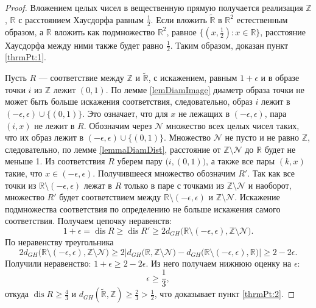 \documentclass[11pt,twoside,draft
]{article}
\DeclareMathOperator{\dis}{dis}
\begin{document}
\begin{proof}
  Вложением целых чисел в вещественную прямую получается реализация
  $\mathbb{Z}$, $\mathbb{R}$ с расстоянием Хаусдорфа равным $\frac 1 2$.
  Если вложить $\widetilde{\mathbb{R}}$ в $\mathbb{R}^{2}$
  естественным образом, а $\mathbb{R}$ вложить как подмножество
  $\mathbb{R}^{2}$, равное $\bigl\{(x, \frac1 2 ):x\in \mathbb{R}\bigr\}$,
  расстояние Хаусдорфа между ними также будет равно $\frac 1 2$.
  Таким образом, доказан пункт \ref{thrmPt:1}.

  Пусть $R$ --- соответствие
  между $\mathbb{Z}$ и $\widetilde{\mathbb{R}}$, с искажением,
  равным $1 + \epsilon$ и
  в образе точки $i$ из $\mathbb{Z}$ лежит $(0,1)$. По лемме
  \ref{lemDiamImage} диаметр
  образа точки не может быть больше искажения соответствия,
  следовательно, образ $i$ лежит в $(-\epsilon, \epsilon) \cup
  \bigl\{(0,1)\bigr\}$. Это
  означает, что для
  $x$ не лежащих в $(-\epsilon, \epsilon)$, пара $(i, x)$ не лежит в $R$.
  Обозначим через $\mathcal{N}$ множество всех целых чисел таких, что их
  образ лежит в $(-\epsilon, \epsilon) \cup \bigl\{(0,1)\bigr\}$. Множество
  $\mathcal{N}$ не пусто и не равно $\mathbb{Z}$, следовательно, по
  лемме \ref{lemmaDiamDist},
  расстояние от $\mathbb{Z} \setminus\mathcal{N}$ до $\mathbb{R}$ будет не
  меньше 1.
  Из соответствия $R$ уберем пару $\bigl(i,(0,1)\bigr)$, а также
  все пары $(k,x)$ такие, что $x \in  (-\epsilon, \epsilon)$.
  Получившееся множество обозначим $R'$.
  Так как все точки из $\mathbb{R}\setminus(-\epsilon, \epsilon)$ лежат в $R$
  только в паре с точками из $ \mathbb{Z} \setminus\mathcal{N}$ и наоборот,
  множество $R'$ будет соответствием между
  $\mathbb{R}\setminus(-\epsilon, \epsilon)$ и
  $ \mathbb{Z} \setminus\mathcal{N}$. Искажение
  подмножества соответствия по определению не больше искажения
  самого соответствия. Получаем цепочку неравенств:
  \[1+\epsilon = \dis R \ge \dis R' \ge
    2d_{GH}\bigl(\mathbb{R}\setminus(-\epsilon, \epsilon), \mathbb{Z}
  \setminus \mathcal{N}\bigr).\]
  По неравенству треугольника
  \[
    2d_{GH}\bigl(\mathbb{R}\setminus(-\epsilon, \epsilon), \mathbb{Z}
    \setminus \mathcal{N}\bigr) \ge
    2\Big|d_{GH}\bigl(\mathbb{R}, \mathbb{Z} \setminus
    \mathcal{N}\bigr) - d_{GH}\bigl(\mathbb{R}\setminus(-\epsilon,
    \epsilon), \mathbb{R}\bigr)\Big| \ge 2 - 2\epsilon.
  \]
  Получили неравенство: $1 + \epsilon \ge 2 - 2\epsilon$.
  Из него получаем нижнюю оценку на $\epsilon$:
  \[\epsilon \ge \frac 1 3,\]
  откуда $\dis R \ge \frac 4 3$ и
  $d_{GH}\left(\widetilde{\mathbb{R}}, \mathbb{Z}\right) \ge \frac 2
  3 > \frac 1 2$,
  что доказывает пункт \ref{thrmPt:2}.
\end{proof}
\end{document}
